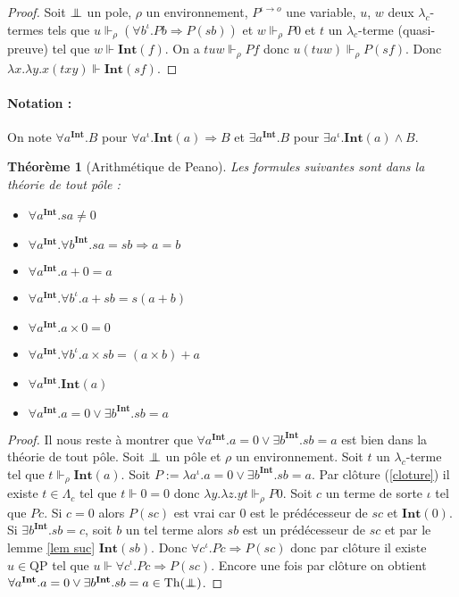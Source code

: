 \documentclass[a4paper,12pt]{article}
\newtheorem{theo}{Théorème}[subsection]
\theoremstyle{rmqstyle}
\newcommand{\QP}{\mathrm{QP}}
\renewcommand{\int}{\mathbf{Int}}
\renewcommand{\implies}{\Rightarrow}
\newcommand{\pole}{{\protect\mathpalette{\protect\polehelper}{\bot}}} \def\polehelper#1#2{\mathrel{\rlap{$#1#2$}\mkern3mu{#1#2}}}
\newcommand{\Th}{\mathrm{Th}}
\begin{document}
\begin{proof}
Soit $\pole$ un pole, $\rho$ un environnement, $P^{\iota \to o}$ une variable, $u$, $w$ deux $\lambda_c$-termes tels que $u \Vdash_\rho (\forall b^\iota. Pb \implies P(sb))$ et $w \Vdash_\rho P0$ et $t$ un $\lambda_c$-terme (quasi-preuve) tel que $w \Vdash \int(f)$. On a $tuw \Vdash_\rho Pf$ donc $u(tuw) \Vdash_\rho P(sf)$. Donc $\lambda x. \lambda y. x(txy) \Vdash \int(sf)$.
\end{proof}

\paragraph{Notation :} On note $\forall a^\int. B$ pour $\forall a^\iota. \int(a) \implies B$ et $\exists a^\int. B$ pour $\exists a^\iota. \int(a) \land B$.

\begin{theo}[Arithmétique de Peano]
Les formules suivantes sont dans la théorie de tout pôle :
\begin{itemize}
\setlength\itemsep{ -1 em}
\item $\forall a^\int. sa \neq 0$\\
\item $\forall a^\int. \forall b^\int. sa = sb \implies a = b$\\
\item $\forall a^\int. a + 0 = a$\\
\item $\forall a^\int. \forall b^\iota. a + sb = s(a + b)$\\
\item $\forall a^\int. a \times 0 = 0$\\
\item $\forall a^\int. \forall b^\iota. a \times sb = (a \times b) + a$\\
\item $\forall a^\int. \int(a)$\\
\item $\forall a^\int. a = 0 \lor \exists b^\int. sb = a$
\end{itemize}
\end{theo}

\begin{proof}
Il nous reste à montrer que $\forall a^\int. a= 0 \lor \exists b^\int. sb = a$ est bien dans la théorie de tout pôle. Soit $\pole$ un pôle et $\rho$ un environnement. Soit $t$ un $\lambda_c$-terme tel que $t \Vdash_\rho \int(a)$. Soit $P := \lambda a^\iota. a = 0 \lor \exists b^\int. sb = a$. Par clôture (\ref{cloture}) il existe $t \in \Lambda_c$ tel que $t \Vdash 0 = 0$ donc $\lambda y. \lambda z. y t \Vdash_\rho P0$. Soit $c$ un terme de sorte $\iota$ tel que $Pc$. Si $c = 0$ alors $P(sc)$ est vrai car $0$ est le prédécesseur de $sc$ et $\int(0)$. Si $\exists b^\int. sb = c$, soit $b$ un tel terme alors $sb$ est un prédécesseur de $sc$ et par le lemme \ref{lem suc} $\int(sb)$. Donc $\forall c^\iota. Pc \implies P(sc)$ donc par clôture il existe $u \in \QP$ tel que $u \Vdash \forall c^\iota. Pc \implies P(sc)$. Encore une fois par clôture on obtient $\forall a^\int. a= 0 \lor \exists b^\int. sb = a \in \Th(\pole)$.
\end{proof}
\end{document}
